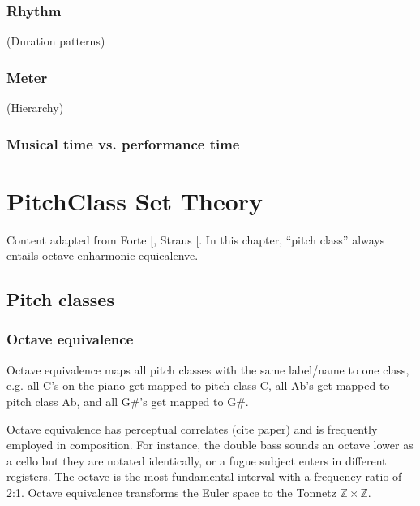 \documentclass[letterpaper,10pt,english]{sphinxmanual}
\begin{document}
\subsection{Rhythm}
\label{\detokenize{1_fundamentals:rhythm}}
(Duration patterns)


\subsection{Meter}
\label{\detokenize{1_fundamentals:meter}}
(Hierarchy)


\subsection{Musical time vs. performance time}
\label{\detokenize{1_fundamentals:musical-time-vs-performance-time}}

\chapter{Pitch\sphinxhyphen{}Class Set Theory}
\label{\detokenize{3_set_theory:pitch-class-set-theory}}\label{\detokenize{3_set_theory::doc}}
Content adapted from Forte {[}\sphinxcite{8_bibliography:id8}{]}, Straus {[}\sphinxcite{8_bibliography:id3}{]}.
In this chapter, “pitch class” always entails octave  enharmonic equicalenve.


\section{Pitch classes}
\label{\detokenize{3_set_theory:pitch-classes}}

\subsection{Octave equivalence}
\label{\detokenize{3_set_theory:octave-equivalence}}
Octave equivalence maps all pitch classes with the same label/name to one class,
e.g. all C’s on the piano get mapped to pitch class C, all Ab’s get mapped to pitch class Ab,
and all G\#’s get mapped to G\#.

Octave equivalence has perceptual correlates (cite paper) and is frequently employed in composition.
For instance, the double bass sounds an octave lower as a cello but they are notated identically,
or a fugue subject enters in different registers.
The octave is the most fundamental interval with a frequency ratio of 2:1.
Octave equivalence transforms the Euler space to the Tonnetz \(\mathbb{Z}\times\mathbb{Z}\).
\end{document}
